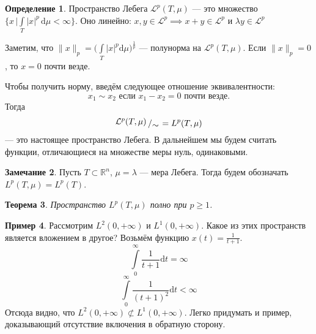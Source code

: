 \documentclass[11pt,openany,a4paper]{scrartcl}
\theoremstyle{plain}
\newtheorem{theorem}{Теорема}[subsection]
\theoremstyle{definition}
\newtheorem{definition}[theorem]{Определение}
\newtheorem{remark}[theorem]{Замечание}
\newtheorem{example}[theorem]{Пример}
\newcommand\mb{\mathbb}
\newcommand\real{\mb R}
\newcommand{\dif}{\, \mathrm d}
\newcommand{\bigslant}[2]{{\raisebox{.2em}{$#1$}\left/\raisebox{-.2em}{$#2$}\right.}}
\begin{document}
\begin{definition}
    Пространство Лебега $\mathcal{L}^p(T, \mu)$ — это множество
    $\{x\, \big| \int\limits_T |x|^p\dif\mu <
    \infty\}$.
    Оно линейно: $x, y \in \mathcal{L}^p \implies
    x + y \in \mathcal{L}^p$ и $\lambda y \in \mathcal{L}^p$
\end{definition}

Заметим, что $\|x\|_p = \bigg(\int\limits_T |x|^p\mathrm d\mu\bigg)^\frac{1}{p}$ — полунорма
на $\mathcal{L}^p(T, \mu)$. Если $\|x\|_p = 0$, то $x = 0$ почти везде.

Чтобы получить норму, введём следующее отношение эквивалентности:
$$
x_1 \sim x_2 \text{ если } x_1 - x_2 = 0 \text{ почти везде.}
$$
Тогда
$$
\bigslant{\mathcal{L}^p(T, \mu)}{\sim} = L^p(T, \mu)
$$
— это настоящее пространство Лебега. В дальнейшем мы будем считать функции, 
отличающиеся на множестве меры нуль, одинаковыми.

\begin{remark}
    Пусть $T \subset \real^n$, $\mu = \lambda$ — мера Лебега. Тогда будем 
    обозначать $L^p(T, \mu) = L^p(T)$.
\end{remark}

\begin{theorem}
    Пространство $L^p(T, \mu)$ полно при $p \geqslant 1$.
\end{theorem}

\begin{example}
    Рассмотрим $L^2(0, +\infty)$ и $L^1(0, +\infty)$. Какое из этих пространств 
    является вложением в другое? Возьмём функцию $x(t) = \frac{1}{t + 1}$.
    $$
    \int\limits_0^\infty \frac{1}{t + 1}\mathrm dt = \infty
    $$
    $$
    \int\limits_0^\infty \frac{1}{(t+1)^2} \mathrm dt < \infty
    $$
    Отсюда видно, что $L^2(0, +\infty) \not\subset L^1(0, +\infty)$. Легко 
    придумать и пример, доказывающий отсутствие включения в обратную сторону.
\end{example}
\end{document}
